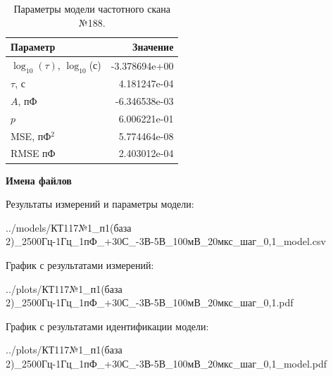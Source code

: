 \begin{table}[!ht]
    \centering
    \caption{Параметры модели частотного скана №188.}
    \begin{tabular}{|l|r|}
        \hline
        Параметр                                       & Значение                  \\ \hline
        $\log_{10}(\tau)$, $\log_{10}$(с)              & -3.378694e+00             \\ \hline
        $\tau$, с                                      & 4.181247e-04              \\ \hline
        $A$, пФ                                        & -6.346538e-03             \\ \hline
        $p$                                            & 6.006221e-01              \\ \hline
        MSE, пФ$^2$                                    & 5.774464e-08              \\ \hline
        RMSE пФ                                        & 2.403012e-04              \\ \hline
    \end{tabular}
    \label{table:frequency_scan_model_188}
\end{table}

\textbf{Имена файлов}

Результаты измерений и параметры модели:

\scriptsize../models/КТ117№1\_п1(база 2)\_2500Гц-1Гц\_1пФ\_+30С\_-3В-5В\_100мВ\_20мкс\_шаг\_0,1\_model.csv
\normalsize

График с результатами измерений:

\scriptsize../plots/КТ117№1\_п1(база 2)\_2500Гц-1Гц\_1пФ\_+30С\_-3В-5В\_100мВ\_20мкс\_шаг\_0,1.pdf
\normalsize

График с результатами идентификации модели:

\scriptsize../plots/КТ117№1\_п1(база 2)\_2500Гц-1Гц\_1пФ\_+30С\_-3В-5В\_100мВ\_20мкс\_шаг\_0,1\_model.pdf
\normalsize

